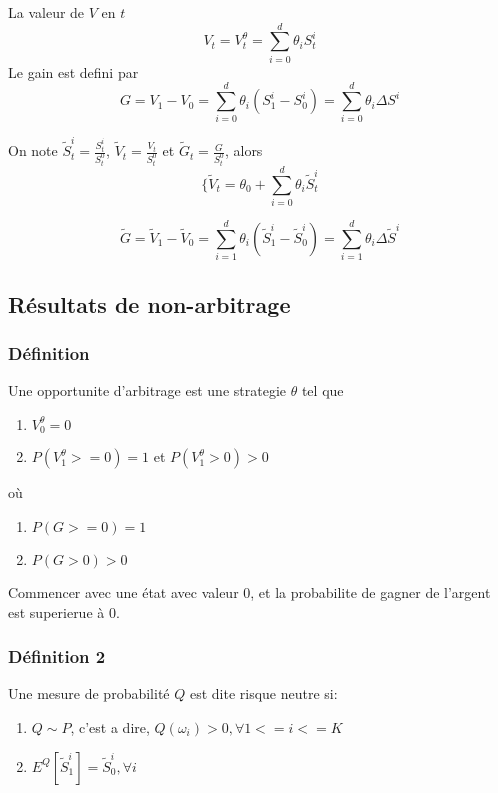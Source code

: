 \documentclass{article}
\begin{document}
La valeur de $V$ en $t$
\begin{equation}
V_t=V_t^\theta=\sum_{i=0}^d\theta_i S_t^i
\end{equation}
Le gain est defini par 
\begin{equation}
G=V_1-V_0=\sum_{i=0}^d \theta_i (S_1^i-S_0^i)=\sum_{i=0}^d \theta_i \Delta S^i
\end{equation}

On note $\tilde{S}_t^i=\frac{S_t^i}{S_t^0}$, $\tilde{V}_t=\frac{V_t}{S_t^0}$ et $\tilde{G}_t=\frac{G}{S_t^0}$,
alors
\begin{equation}
\{\tilde{V}_t=\theta_0+\sum_{i=0}^{d}\theta_i \tilde{S}_t^i
\end{equation}

\begin{equation}
\tilde{G}=\tilde{V}_1-\tilde{V}_0=\sum_{i=1}^d \theta_i (\tilde{S}_1^i-\tilde{S}_0^i)=\sum_{i=1}^d\theta_i\Delta \tilde{S}^i
\end{equation}

\subsection{R\'esultats de non-arbitrage}
\subsubsection{D\'efinition}

Une opportunite d'arbitrage est une strategie $\theta$ tel que 
\begin{enumerate}
	\item  $V_0^\theta =0$
	\item $P(V_1^\theta >=0) = 1$ et $P(V_1^\theta>0)>0$ 
\end{enumerate}
o\`u
\begin{enumerate}
	\item $P(G>=0) = 1$
	\item $P(G>0) > 0$
\end{enumerate}

Commencer avec une \'etat avec valeur $0$, et la probabilite de gagner de l'argent est superierue \`a $0$.

\subsubsection{D\'efinition 2}

Une mesure de probabilit\'e $Q$ est dite risque neutre si:
\begin{enumerate}
	\item $Q\sim P$, c'est a dire, $Q(\omega_i)>0, \forall 1<=i<=K$
	\item $E^Q[\tilde{S}_1^i]=\tilde{S}_0^i, \forall i$
\end{enumerate}
\end{document}
